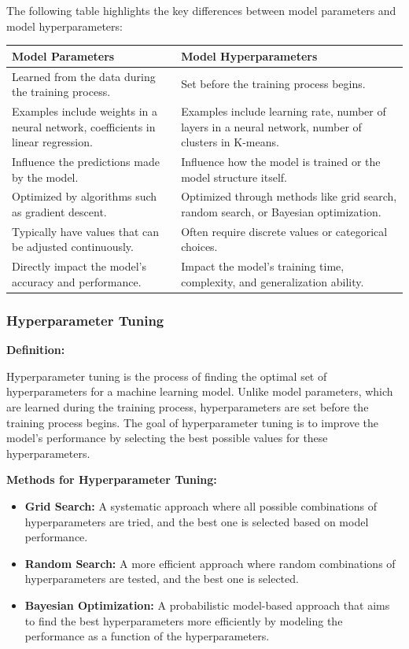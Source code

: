 \documentclass{exam}
\begin{document}
The following table highlights the key differences between model parameters and model hyperparameters:

\begin{center}
\begin{tabular}{|p{7cm}|p{7cm}|}
\hline
\textbf{Model Parameters} & \textbf{Model Hyperparameters} \\
\hline
Learned from the data during the training process. & Set before the training process begins. \\
\hline
Examples include weights in a neural network, coefficients in linear regression. & Examples include learning rate, number of layers in a neural network, number of clusters in K-means. \\
\hline
Influence the predictions made by the model. & Influence how the model is trained or the model structure itself. \\
\hline
Optimized by algorithms such as gradient descent. & Optimized through methods like grid search, random search, or Bayesian optimization. \\
\hline
Typically have values that can be adjusted continuously. & Often require discrete values or categorical choices. \\
\hline
Directly impact the model's accuracy and performance. & Impact the model's training time, complexity, and generalization ability. \\
\hline
\end{tabular}
\end{center}

\subsubsection{Hyperparameter Tuning}

\textbf{Definition:}

Hyperparameter tuning is the process of finding the optimal set of hyperparameters for a machine learning model. Unlike model parameters, which are learned during the training process, hyperparameters are set before the training process begins. The goal of hyperparameter tuning is to improve the model's performance by selecting the best possible values for these hyperparameters.

\textbf{Methods for Hyperparameter Tuning:}
\begin{itemize}
    \item \textbf{Grid Search:} A systematic approach where all possible combinations of hyperparameters are tried, and the best one is selected based on model performance.
    \item \textbf{Random Search:} A more efficient approach where random combinations of hyperparameters are tested, and the best one is selected.
    \item \textbf{Bayesian Optimization:} A probabilistic model-based approach that aims to find the best hyperparameters more efficiently by modeling the performance as a function of the hyperparameters.
\end{itemize}
\end{document}
